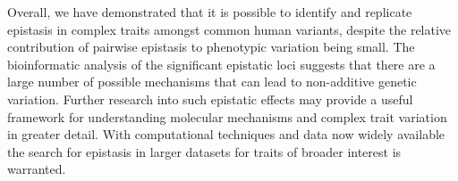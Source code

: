 \documentclass{article}
\begin{document}
Overall, we have demonstrated that it is possible to identify and replicate epistasis in complex traits amongst common human variants, despite the relative contribution of pairwise epistasis to phenotypic variation being small. The bioinformatic analysis of the significant epistatic loci suggests that there are a large number of possible mechanisms that can lead to non-additive genetic variation. Further research into such epistatic effects may provide a useful framework for understanding molecular mechanisms and complex trait variation in greater detail. With computational techniques and data now widely available the search for epistasis in larger datasets for traits of broader interest is warranted.







\end{document}

